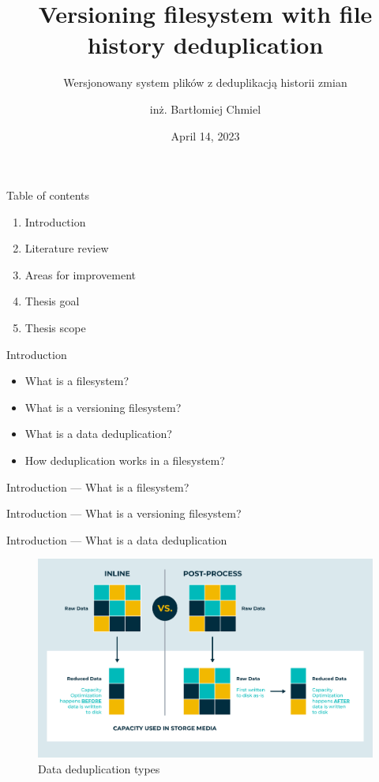 \documentclass[xcolor=table]{beamer}
\title{Versioning filesystem with file history deduplication}
\subtitle{Wersjonowany system plików z deduplikacją historii zmian}
\author[author1]{inż. Bartłomiej Chmiel}
\institute{Faculty of Information and Communication Technology}
\date{April 14, 2023}
\begin{document}
	\frame{\titlepage}

	\begin{frame}{Table of contents}
		\begin{enumerate}
			\item Introduction
			\item Literature review
			\item Areas for improvement
			\item Thesis goal
			\item Thesis scope
		\end{enumerate}
	\end{frame}

	\begin{frame}{Introduction}
		\begin{itemize}
			\item What is a filesystem?
			\item What is a versioning filesystem?
			\item What is a data deduplication?
			\item How deduplication works in a filesystem?
		\end{itemize}
	\end{frame}

	\begin{frame}{Introduction --- What is a filesystem?}
		
	\end{frame}

	\begin{frame}{Introduction --- What is a versioning filesystem?}
		
	\end{frame}

	\begin{frame}{Introduction --- What is a data deduplication}
		\begin{figure}
			\centering
			\includegraphics[width=\textwidth]{media/dedup-types.png}
			\caption{Data deduplication types}
		\end{figure}
	\end{frame}
\end{document}
